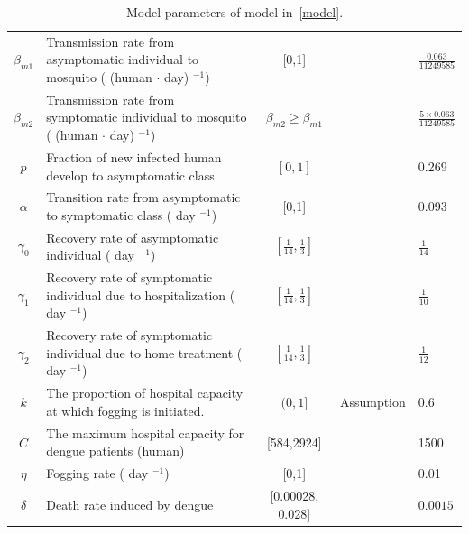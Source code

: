\documentclass[preprint]{elsarticle}
\begin{document}
\begin{landscape}
\begin{table}
\begin{tabular}{cp{10cm}ccp{2cm}}
         $\beta_{m1}$ & Transmission rate from asymptomatic individual to mosquito ( (human $\cdot$ day) $^{-1}$) & [0,1] & \cite{ALDILA2024115729,MAIER201715,ANGGRIANI201962,BOCK2019108219} & $\frac{0.063}{11249585}$\\
         $\beta_{m2}$ & Transmission rate from symptomatic individual to mosquito ( (human $\cdot$ day) $^{-1}$) & $\beta_{m2}\geq \beta_{m1}$ & \cite{ALDILA2024115729} & $\frac{5\times0.063}{11249585}$\\
         $p$ & Fraction of new infected human develop to asymptomatic class & $[0,1]$ & \cite{ALDILA2024115729}  & 0.269\\
         $\alpha$ & Transition rate from asymptomatic to symptomatic class ( day $^{-1}$) & [0,1] & \cite{ALDILA2024115729,BOCK2019108219, Knerer2020DengueThailand,CHAMPAGNE20191} & 0.093\\

         $\gamma_0$ & Recovery rate of asymptomatic individual ( day $^{-1}$) & $\left[\frac{1}{14},\frac{1}{3}\right]$ & \cite{ALDILA2024115729,WOODALL201467,XUE2021125742,Rashkov01012021} & $\frac{1}{14}$ \\
         $\gamma_1$ & Recovery rate of symptomatic individual due to hospitalization ( day $^{-1}$) & $\left[\frac{1}{14},\frac{1}{3}\right]$  & \cite{ALDILA2024115729,WOODALL201467,XUE2021125742,Rashkov01012021} & $\frac{1}{10}$\\
         $\gamma_2$ & Recovery rate of symptomatic individual due to home treatment ( day $^{-1}$) & $\left[\frac{1}{14},\frac{1}{3}\right]$ & \cite{ALDILA2024115729,WOODALL201467,XUE2021125742,Rashkov01012021} & $\frac{1}{12}$\\

         $k$ & The proportion of hospital capacity at which fogging is initiated. & $(0,1]$ & Assumption & 0.6\\
         $C$ & The maximum hospital capacity for dengue patients (human) & [584,2924] & \cite{hospitalBedsJakarta} & 1500 \\
         $\eta$  & Fogging rate ( day $^{-1}$) & [0,1] & \cite{NAALY2024100159,MAYEDA2026508} &0.01\\
         $\delta$ & Death rate induced by dengue & [0.00028, 0.028]& \cite{Schaefer2025DengueFever,HAIDER2025107940,KemenkesPusatKrisisDBD2026} & $0.0015$\\
         \hline
    \end{tabular}
    \caption{Model parameters of model in~\eqref{model}.} %
    \label{tab:placeholder}
\end{table}
\end{landscape}
\end{document}
